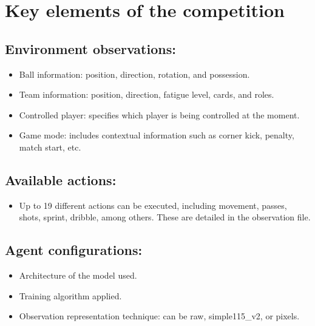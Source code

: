\section{Key elements of the competition}

\subsection*{Environment observations:}
\begin{itemize}
    \item Ball information: position, direction, rotation, and possession.
    \item Team information: position, direction, fatigue level, cards, and roles.
    \item Controlled player: specifies which player is being controlled at the moment.
    \item Game mode: includes contextual information such as corner kick, penalty, match start, etc.
\end{itemize}

\subsection*{Available actions:}
\begin{itemize}
    \item Up to 19 different actions can be executed, including movement, passes, shots, sprint, dribble, among others. These are detailed in the observation file.
\end{itemize}

\subsection*{Agent configurations:}
\begin{itemize}
    \item Architecture of the model used.
    \item Training algorithm applied.
    \item Observation representation technique: can be raw, simple115\_v2, or pixels.
\end{itemize}

